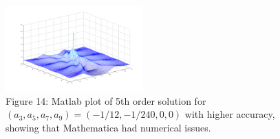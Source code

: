 \documentclass{beamer}
\theoremstyle{plain}
\theoremstyle{definition}
\begin{document}
\frame
{
\begin{figure}
\begin{center}
\includegraphics[width=200px]{matlab_5th_order_peak.png}\\
Figure 14: Matlab plot of 5th order solution for $(a_3,a_5,a_7,a_9)=(-1/12,-1/240,0,0)$ with higher accuracy, showing that Mathematica had numerical issues.
\end{center}
\end{figure}
\vspace{-1mm}
}
\end{document}
